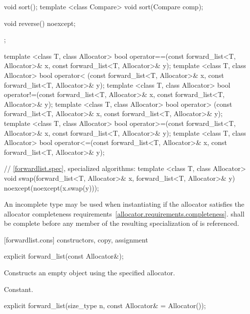 \begin{codeblock}
{{    void sort();
    template <class Compare> void sort(Compare comp);

    void reverse() noexcept;
  };

  template <class T, class Allocator>
    bool operator==(const forward_list<T, Allocator>& x, const forward_list<T, Allocator>& y);
  template <class T, class Allocator>
    bool operator< (const forward_list<T, Allocator>& x, const forward_list<T, Allocator>& y);
  template <class T, class Allocator>
    bool operator!=(const forward_list<T, Allocator>& x, const forward_list<T, Allocator>& y);
  template <class T, class Allocator>
    bool operator> (const forward_list<T, Allocator>& x, const forward_list<T, Allocator>& y);
  template <class T, class Allocator>
    bool operator>=(const forward_list<T, Allocator>& x, const forward_list<T, Allocator>& y);
  template <class T, class Allocator>
    bool operator<=(const forward_list<T, Allocator>& x, const forward_list<T, Allocator>& y);

  // \ref{forwardlist.spec}, specialized algorithms:
  template <class T, class Allocator>
    void swap(forward_list<T, Allocator>& x, forward_list<T, Allocator>& y)
      noexcept(noexcept(x.swap(y)));
}
\end{codeblock}

\pnum
An incomplete type  may be used when instantiating 
if the allocator satisfies the
allocator completeness requirements~\ref{allocator.requirements.completeness}.
 shall be complete before any member of the resulting specialization
of  is referenced.

[forwardlist.cons]{ constructors, copy, assignment}

%
\begin{itemdecl}
explicit forward_list(const Allocator&);
\end{itemdecl}

\begin{itemdescr}
\pnum
\effects Constructs an empty  object using the specified allocator.

\pnum
\complexity Constant.
\end{itemdescr}

%
\begin{itemdecl}
explicit forward_list(size_type n, const Allocator& = Allocator());
\end{itemdecl}

